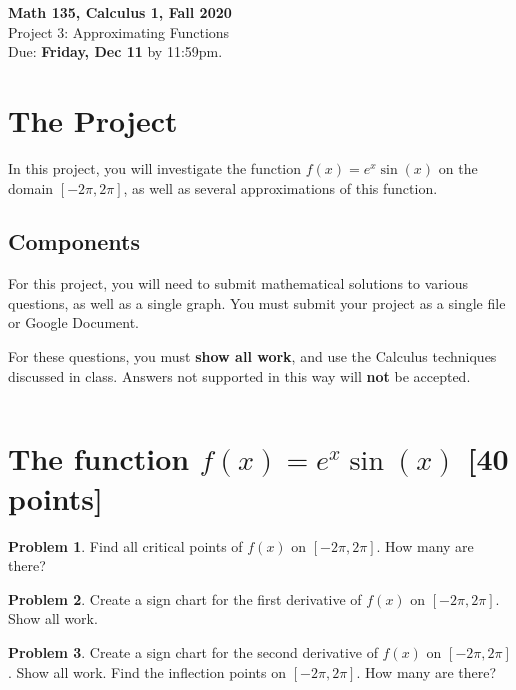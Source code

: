 \documentclass[11pt,reqno,final]{amsart}
\numberwithin{equation}{section}
\numberwithin{figure}{section}
\theoremstyle{definition} %
\newtheorem{problem}{Problem}
\begin{document}
\onehalfspacing

\begin{center}
        \textbf{\Large Math 135, Calculus 1, Fall 2020}\\[10pt]
        {\large Project 3: Approximating Functions}\\
        Due: \textbf{Friday, Dec 11} by 11:59pm.
\end{center}

\thispagestyle{empty}

\renewcommand{\thesection}{\Alph{section}}


\section*{The Project}

In this project, you will investigate the function $f(x) = e^x \sin(x)$ on the domain $[-2\pi, 2\pi]$, as well as several approximations of this function.

\subsection*{Components}

For this project, you will need to submit mathematical solutions to various questions, as well as a single graph.
You must submit your project as a single file or Google Document.

For these questions, you must \textbf{show all work}, and use the Calculus techniques discussed in class. Answers not supported in this way will \textbf{not} be accepted.

$ $

\section{The function $f(x) = e^x \sin(x)$ [40 points]}


\begin{problem}
        Find all critical points of $f(x)$ on $[-2\pi, 2\pi]$. How many are there?
\end{problem}

\begin{problem}
        Create a sign chart for the first derivative of $f(x)$ on $[-2\pi, 2\pi]$. Show all work.
\end{problem}

\begin{problem}
        Create a sign chart for the second derivative of $f(x)$ on $[-2\pi, 2\pi]$. Show all work. Find the inflection points on $[-2\pi, 2\pi]$. How many are there?
\end{problem}
\end{document}
